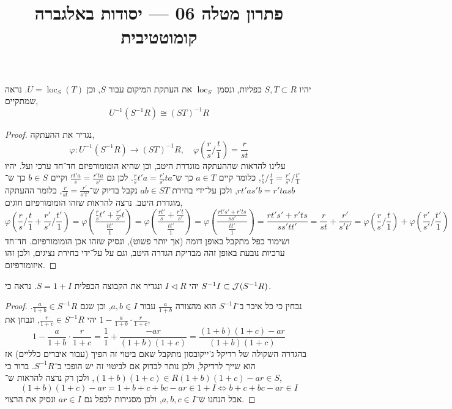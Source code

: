 
\title{פתרון מטלה 06 --- יסודות באלגברה קומוטטיבית}

\DeclareMathOperator{\loc}{loc}
\DeclareMathOperator{\Frac}{Frac}
\DeclareMathOperator{\Ann}{Ann}


\maketitle
\maketitleprint[red]

\question{}
יהיו $S, T \subset R$ כפליות, ונסמן $\loc_S$ את העתקת המיקום עבור $S$, וכן $U = \loc_S(T)$.
נראה שמתקיים,
\[
	U^{-1}(S^{-1} R)
	\cong {(S T)}^{-1} R
\]
\begin{proof}
	נגדיר את ההעתקה,
	\[
		\varphi : U^{-1}(S^{-1} R) \to {(S T)}^{-1} R,
		\quad
		\varphi(\frac{r}{s} / \frac{t}{1})
		= \frac{r}{s t}
	\]
	עלינו להראות שההעתקה מוגדרת היטב, וכן שהיא הומומורפיזם חד־חד ערכי ועל.
	יהיו $\frac{r}{s} / \frac{t}{1} = \frac{r'}{s'} / \frac{t'}{1}$, כלומר קיים $a \in T$ כך ש־$\frac{r}{s} t' a = \frac{r'}{s'} t a$.
	לכן גם $\frac{r t' a}{s} = \frac{r' t a}{s'}$ וקיים $b \in S$ כך ש־$r t' a s' b = r' t a s b$, ולכן על־ידי בחירת $a b \in S T$ נקבל בדיוק ש־$\frac{r}{s t} = \frac{r'}{s' t'}$, כלומר ההעתקה מוגדרת היטב.
	נרצה להראות שזהו הומומורפיזם חוגים,
	\[
		\varphi(\frac{r}{s} / \frac{t}{1} + \frac{r'}{s'} / \frac{t'}{1})
		= \varphi(\frac{\frac{r}{s} t' + \frac{r'}{s'} t}{\frac{t t'}{1}})
		= \varphi(\frac{\frac{r t'}{s} + \frac{r' t}{s'}}{\frac{t t'}{1}})
		= \varphi(\frac{\frac{r t' s' + r' t s}{s s'}}{\frac{t t'}{1}})
		= \frac{r t' s' + r' t s}{s s' t t'}
		= \frac{r}{s t} + \frac{r'}{s' t'}
		= \varphi(\frac{r}{s} / \frac{t}{1}) + \varphi(\frac{r'}{s'} / \frac{t'}{1})
	\]
	ושימור כפל מתקבל באופן דומה (אך יותר פשוט), ונסיק שזהו אכן הומומורפיזם.
	חד־חד ערכיות נובעת באופן זהה מבדיקת הגדרה היטב, וגם על על־ידי בחירת נציגים, ולכן זהו איזומורפיזם.
\end{proof}

\question{}
יהי $I \triangleleft R$ ונגדיר את הקבוצה הכפלית $S = 1 + I$.
נראה כי $S^{-1} I \subset \mathcal{J}(S^{-1} R)$.
\begin{proof}
	נבחין כי כל איבר ב־$S^{-1} I$ הוא מהצורה $\frac{a}{1 + b}$ עבור $a, b \in I$, וכן שגם $\frac{a}{1 + b} \in S^{-1} R$.
	יהי $\frac{r}{1 + c} \in S^{-1} R$, ונבחן את $1 - \frac{a}{1 + b} \cdot \frac{r}{1 + c}$,
	\[
		1 - \frac{a}{1 + b} \cdot \frac{r}{1 + c}
		= \frac{1}{1} + \frac{- a r}{(1 + b)(1 + c)}
		= \frac{(1 + b)(1 + c) - a r}{(1 + b)(1 + c)}
	\]
	בהגדרה השקולה של רדיקל ג'ייקובסון מתקבל שאם ביטוי זה הפיך (עבור איברים כלליים) אז הוא שייך לרדיקל, ולכן נותר לבדוק אם לביטוי זה יש הופכי ב־$S^{-1} R$.
	ברור כי $(1 + b)(1 + c) \in R$, ולכן רק נרצה להראות ש־$(1 + b)(1 + c) - a r \in S$,
	\[
		(1 + b)(1 + c) - a r
		= 1 + b + c + b c - a r
		\in 1 + I
		\iff b + c + b c - a r
		\in I
	\]
	אבל הנחנו ש־$a, b, c \in I$, ולכן מסגירות לכפל גם $a r \in I$ ונסיק את הרצוי.
\end{proof}


